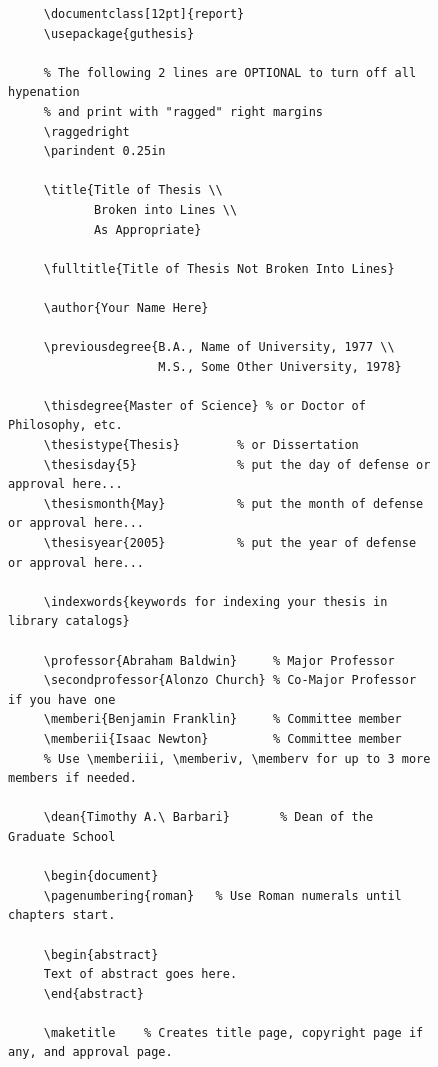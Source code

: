\documentclass[12pt]{report}
\begin{document}
\begin{figure}
\begin{center}
\begin{minipage}{5in}
\tiny
\begin{verbatim}
     \documentclass[12pt]{report}
     \usepackage{guthesis}

     % The following 2 lines are OPTIONAL to turn off all hypenation
     % and print with "ragged" right margins
     \raggedright
     \parindent 0.25in

     \title{Title of Thesis \\
            Broken into Lines \\
            As Appropriate}

     \fulltitle{Title of Thesis Not Broken Into Lines}

     \author{Your Name Here}

     \previousdegree{B.A., Name of University, 1977 \\
                     M.S., Some Other University, 1978}

     \thisdegree{Master of Science} % or Doctor of Philosophy, etc.
     \thesistype{Thesis}        % or Dissertation
     \thesisday{5}              % put the day of defense or approval here...
     \thesismonth{May}          % put the month of defense or approval here...
     \thesisyear{2005}          % put the year of defense or approval here...

     \indexwords{keywords for indexing your thesis in library catalogs}

     \professor{Abraham Baldwin}     % Major Professor
     \secondprofessor{Alonzo Church} % Co-Major Professor if you have one
     \memberi{Benjamin Franklin}     % Committee member
     \memberii{Isaac Newton}         % Committee member
     % Use \memberiii, \memberiv, \memberv for up to 3 more members if needed.

     \dean{Timothy A.\ Barbari}       % Dean of the Graduate School

     \begin{document}
     \pagenumbering{roman}   % Use Roman numerals until chapters start.

     \begin{abstract}
     Text of abstract goes here.
     \end{abstract}

     \maketitle    % Creates title page, copyright page if any, and approval page.


\end{verbatim}
\end{minipage}
\end{center}
\end{figure}
\end{document}
